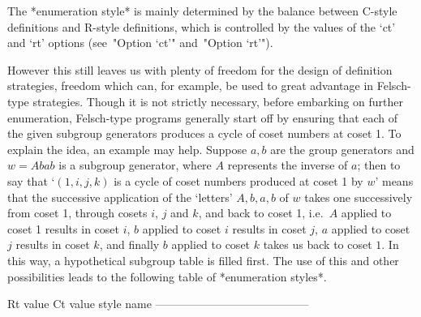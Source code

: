 \endlist

The *enumeration style* is mainly determined by  the  balance  between
C-style definitions and R-style definitions, which  is  controlled  by
the values of the `ct' and `rt' options (see~"Option `ct'" and~"Option
`rt'").

However this still leaves us with plenty of freedom for the design  of
definition strategies, freedom which can,  for  example,  be  used  to
great advantage in Felsch-type strategies. Though it is  not  strictly
necessary,  before  embarking  on  further  enumeration,   Felsch-type
programs generally start off  by  ensuring  that  each  of  the  given
subgroup generators produces a cycle of coset numbers at coset  1.  To
explain the idea, an example may help. Suppose  $a,b$  are  the  group
generators and $w=Abab$ is a subgroup generator, where $A$  represents
the inverse of $a$; then to say that \lq{}$(1,i,j,k)$ is  a  cycle  of
coset numbers produced at coset 1 by $w$' means  that  the  successive
application  of  the  \lq{}letters'  $A,b,a,b$  of   $w$   takes   one
successively from coset 1, through cosets $i$, $j$ and $k$,  and  back
to coset 1, i.e.~$A$ applied to coset 1  results  in  coset  $i$,  $b$
applied to coset $i$ results in coset $j$, $a$ applied  to  coset  $j$
results in coset $k$, and finally $b$ applied to coset  $k$  takes  us
back to coset $1$. In this  way,  a  hypothetical  subgroup  table  is
filled first. The use of this and other  possibilities  leads  to  the
following table of *enumeration styles*.

\begintt
Rt value     Ct value     style name
-----------------------------------------


